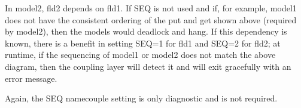 In model2, fld2 depends on fld1. If SEQ is not used and if, for example, model1 does not have the
consistent ordering of the put and get shown above (required by model2), then the models would deadlock and hang. If this dependency is known, there is a benefit in setting SEQ=1 for fld1 and SEQ=2 for fld2; at
runtime, if the sequencing of model1 or model2 does not match the
above diagram, then the  coupling layer will detect it and will exit gracefully with an error message.

Again, the SEQ namecouple setting is only diagnostic and is not
required.





